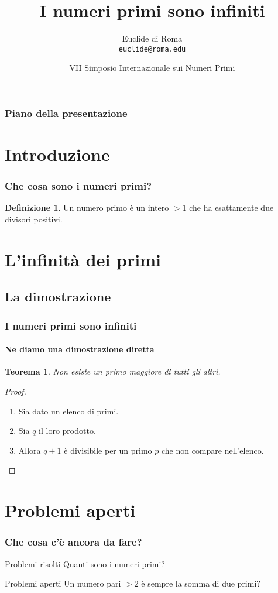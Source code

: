 \documentclass{beamer}
\title{I numeri primi sono infiniti}
\author[Euclide]{Euclide di Roma \\
\texttt{euclide@roma.edu}}
\date[VII SINP]{VII Simposio Internazionale sui Numeri Primi}
\institute[Roma]{Università di Roma}
\theoremstyle{definition}
\newtheorem{definizione}{Definizione}
\theoremstyle{plain}
\newtheorem{teorema}{Teorema}
\begin{document}
\titlepageframe %


\begin{frame}
  \frametitle{Piano della presentazione}
  \tableofcontents
\end{frame}


\section{Introduzione}
\begin{frame}
\frametitle{Che cosa sono i numeri primi?}
\begin{definizione}
Un \alert{numero primo} è un intero $>1$ che ha esattamente
due divisori positivi.
\end{definizione}
\end{frame}

\section{L'infinità dei primi}
\subsection{La dimostrazione}
\begin{frame}
\frametitle{I numeri primi sono infiniti}
\framesubtitle{Ne diamo una dimostrazione diretta}
\begin{teorema}
Non esiste un primo maggiore di tutti gli altri.
\end{teorema}
\pause
\begin{proof}
\begin{enumerate}[<+->]
\item Sia dato un elenco di primi.
\item Sia $q$ il loro prodotto.
\item Allora $q+1$ è divisibile per un primo $p$
che non compare nell’elenco. \qedhere
\end{enumerate}
\end{proof}
\end{frame}
\section{Problemi aperti}
\begin{frame}
\frametitle{Che cosa c’è ancora da fare?}
\begin{block}{Problemi risolti}
Quanti sono i numeri primi?
\end{block}
\begin{alertblock}{Problemi aperti}
Un \alert{numero} pari $>2$ è sempre la somma di due primi?
\end{alertblock}
\end{frame}
\end{document}

